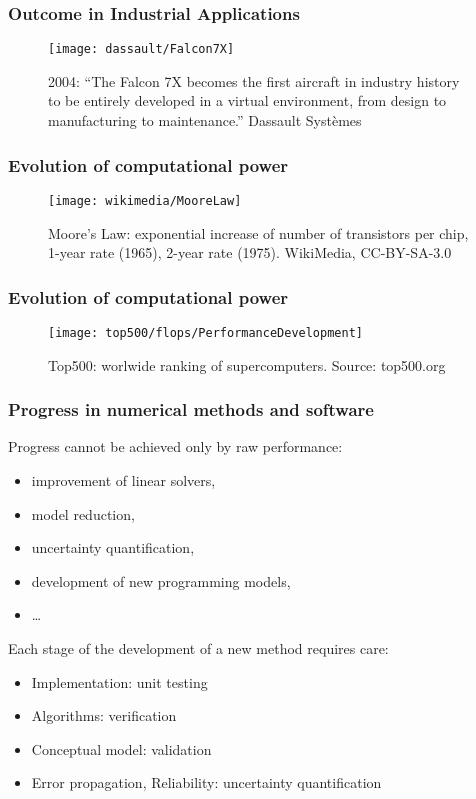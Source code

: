 \begin{frame}
  \frametitle{Outcome in Industrial Applications}

\begin{figure}
\centering
\texttt{[image: dassault/Falcon7X]}
\caption{2004: ``The Falcon 7X becomes the first aircraft in industry history to be entirely developed in a virtual environment, from design to manufacturing to maintenance.'' Dassault Systèmes}
\end{figure}

\end{frame}

\begin{frame}
  \frametitle{Evolution of computational power}
\begin{figure}
\centering
\texttt{[image: wikimedia/MooreLaw]}
\caption{Moore's Law: exponential increase of number of transistors per chip,  1-year rate (1965), 2-year rate (1975). WikiMedia, CC-BY-SA-3.0}
\end{figure}

\end{frame}

\begin{frame}
  \frametitle{Evolution of computational power}


\begin{figure}
\centering
\texttt{[image: top500/flops/PerformanceDevelopment]}
\caption{Top500: worlwide ranking of supercomputers. Source: top500.org}
\end{figure}

\end{frame}

\begin{frame}
  \frametitle{Progress in numerical methods and software}

Progress cannot be achieved only by raw performance:
\begin{itemize}
\item improvement of linear solvers,
\item model reduction,
\item uncertainty quantification,
\item development of new programming models,
\item \dots
\end{itemize}

Each stage of the development of a new method requires care:
\begin{itemize}
\item Implementation: unit testing
\item Algorithms: verification
\item Conceptual model: validation
\item Error propagation, Reliability: uncertainty quantification
\end{itemize}

\end{frame}

